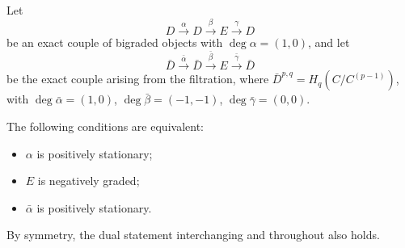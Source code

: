 Let
\[
D \xrightarrow{\alpha} D \xrightarrow{\beta} E \xrightarrow{\gamma} D
\]
be an exact couple of bigraded objects with $\deg \alpha = (1,0)$, and let
\[
\bar{D} \xrightarrow{\bar{\alpha}} \bar{D} \xrightarrow{\bar{\beta}} E \xrightarrow{\bar{\gamma}} \bar{D}
\]
be the exact couple arising from the filtration, where $\bar{D}^{p,q} = H_q(C/C^{(p-1)})$, with $\deg \bar{\alpha} = (1,0)$, $\deg \bar{\beta} = (-1,-1)$, $\deg \bar{\gamma} = (0,0)$.

The following conditions are equivalent:
\begin{itemize}
\item[(i)] $\alpha$ is positively stationary;
\item[(ii)] $E$ is negatively graded;
\item[(iii)] $\bar{\alpha}$ is positively stationary.
\end{itemize}

By symmetry, the dual statement interchanging  and  throughout also holds.

